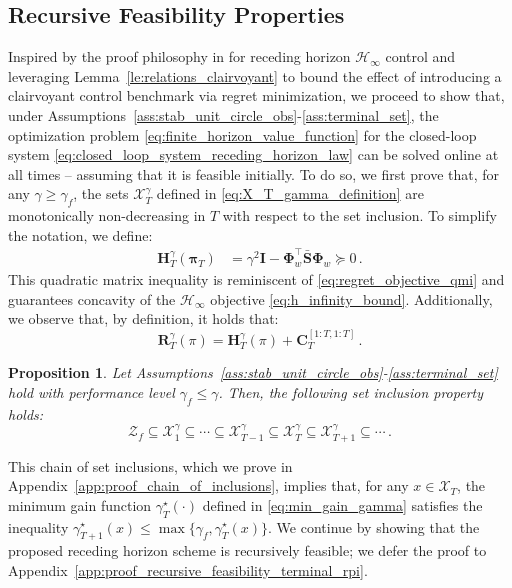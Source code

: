 \documentclass[conference]{IEEEtran}
\newtheorem{proposition}{Proposition}
\begin{document}
\subsection{Recursive Feasibility Properties}
Inspired by the proof philosophy in \cite{goulart2009control} for receding horizon $\mathcal{H}_\infty$ control and leveraging Lemma~\ref{le:relations_clairvoyant} to bound the effect of introducing a clairvoyant control benchmark via regret minimization, we proceed to show that, under Assumptions~\ref{ass:stab_unit_circle_obs}-\ref{ass:terminal_set}, the optimization problem \eqref{eq:finite_horizon_value_function} for the closed-loop system \eqref{eq:closed_loop_system_receding_horizon_law} can be solved online at all times – assuming that it is feasible initially. %
To do so, we first prove that, for any $\gamma \geq \gamma_f$, the sets $\mathcal{X}_T^\gamma$ defined in \eqref{eq:X_T_gamma_definition} %
are monotonically non-decreasing in $T$ with respect to the set inclusion. To simplify the notation, we define:%
\begin{align}
    \label{eq:h_infinity_objective_qmi}
    \mathbf{H}_T^\gamma(\bm{\pi}_T) &=  \gamma^2 \mathbf{I} -
    \bm{\Phi}_w^\top
    \bar{\mathbf{S}}
    \bm{\Phi}_w
    \succeq 0\,.
\end{align}
This quadratic matrix inequality is reminiscent of \eqref{eq:regret_objective_qmi} and guarantees concavity of the  $\mathcal{H}_\infty$ objective \eqref{eq:h_infinity_bound}. %
Additionally, we observe that, by definition, it holds that:
\begin{equation*}
    \mathbf{R}_T^\gamma(\pi) = \mathbf{H}_T^\gamma(\pi) + \mathbf{C}_{T}^{[1:T, 1:T]}\,.
\end{equation*}

\begin{proposition}
    \label{prop:chain_of_inclusions}
    Let Assumptions~\ref{ass:stab_unit_circle_obs}-\ref{ass:terminal_set} hold with performance level $\gamma_f \leq \gamma$. Then, the following set inclusion property holds:
    \begin{equation*}
        \mathcal{Z}_f \subseteq \mathcal{X}_1^\gamma \subseteq \cdots \subseteq \mathcal{X}_{T-1}^\gamma \subseteq \mathcal{X}_T^\gamma \subseteq \mathcal{X}_{T+1}^\gamma \subseteq \cdots\,.
    \end{equation*}
\end{proposition}

This chain of set inclusions, which we prove in Appendix~\ref{app:proof_chain_of_inclusions}, implies that, for any $x \in \mathcal{X}_T$, the minimum gain function $\gamma^\star_T(\cdot)$ defined in \eqref{eq:min_gain_gamma} satisfies the inequality $\gamma^\star_{T+1}(x) \leq \operatorname{max}\{\gamma_f, \gamma^\star_T(x)\}$.
We continue by showing that the proposed receding horizon scheme is recursively feasible; we defer the proof to Appendix~\ref{app:proof_recursive_feasibility_terminal_rpi}.
\end{document}
